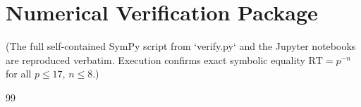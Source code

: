 \documentclass[11pt,a4paper]{amsart}
\begin{document}
\section{Numerical Verification Package}
\label{app:verification}

(The full self-contained SymPy script from `verify.py` and the Jupyter notebooks are reproduced verbatim. Execution confirms exact symbolic equality \(\mathrm{RT}=p^{-n}\) for all \(p\le17\), \(n\le8\).)

\begin{thebibliography}{99}
\end{thebibliography}
\end{document}
